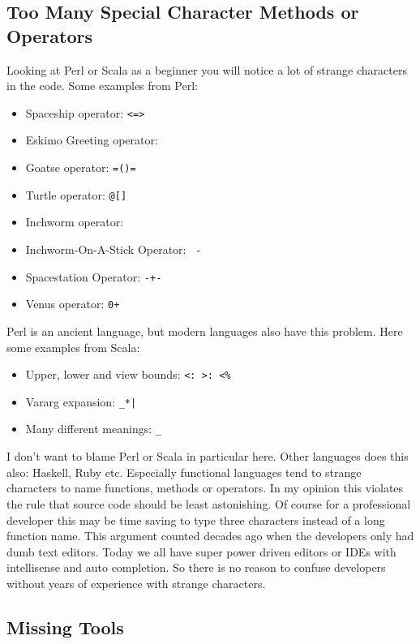 \documentclass[11pt, a4paper]{report}
\begin{document}
\subsection{Too Many Special Character Methods or Operators}

Looking at Perl or Scala as a beginner you will notice a lot of strange characters in the code. Some examples from Perl\cite{secret-perl-operators}:

\begin{itemize}
    \item Spaceship operator: \texttt{<=>}
    \item Eskimo Greeting operator: \texttt{}{}
    \item Goatse operator: \texttt{=()=}
    \item Turtle operator: \texttt{@{[]}}
    \item Inchworm operator: \texttt{~~}
    \item Inchworm-On-A-Stick Operator: \texttt{~-}
    \item Spacestation Operator: \texttt{-+-}
    \item Venus operator: \texttt{0+}
\end{itemize}

Perl is an ancient language, but modern languages also have this problem. Here some examples from Scala\cite{special-operators-scala}:

\begin{itemize}
    \item Upper, lower and view bounds: \texttt{<: >: <\%}
    \item Vararg expansion: \texttt{\_*|}
    \item Many different meanings: \texttt{\_}
\end{itemize}

I don't want to blame Perl or Scala in particular here. Other languages does this also: Haskell, Ruby etc. Especially functional languages tend to strange characters to name functions, methods or operators. In my opinion this violates the rule that source code should be least astonishing. Of course for a professional developer this may be time saving to type three characters instead of a long function name. This argument counted decades ago when the developers only had dumb text editors. Today we all have super power driven editors or IDEs with intellisense and auto completion. So there is no reason to confuse developers without years of experience with strange characters.

\subsection{Missing Tools}
\end{document}
